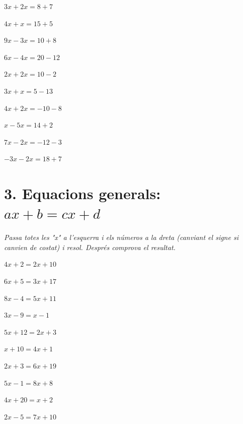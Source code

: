 \documentclass[12pt,a4paper]{article}
\begin{document}
\begin{enumerate}[label=\alph*), itemsep=1ex]
    \begin{minipage}[t]{0.45\textwidth}
        \item $3x + 2x = 8 + 7$
        \item $4x + x = 15 + 5$
        \item $9x - 3x = 10 + 8$
        \item $6x - 4x = 20 - 12$
        \item $2x + 2x = 10 - 2$
    \end{minipage}
    \begin{minipage}[t]{0.45\textwidth}
        \item $3x + x = 5 - 13$
        \item $4x + 2x = -10 - 8$
        \item $x - 5x = 14 + 2$
        \item $7x - 2x = -12 - 3$
        \item $-3x - 2x = 18 + 7$
    \end{minipage}
\end{enumerate}

\vspace{0.8cm}
\newpage
\section*{3. Equacions generals: $ax + b = cx + d$}
\textit{Passa totes les "x" a l'esquerra i els números a la dreta (canviant el signe si canvien de costat) i resol. Després comprova el resultat.}

\begin{enumerate}[label=\alph*), itemsep=1ex]
    \begin{minipage}[t]{0.45\textwidth}
        \item $4x + 2 = 2x + 10$
        \item $6x + 5 = 3x + 17$
        \item $8x - 4 = 5x + 11$
        \item $3x - 9 = x - 1$
        \item $5x + 12 = 2x + 3$
    \end{minipage}
    \begin{minipage}[t]{0.45\textwidth}
        \item $x + 10 = 4x + 1$
        \item $2x + 3 = 6x + 19$
        \item $5x - 1 = 8x + 8$
        \item $4x + 20 = x + 2$
        \item $2x - 5 = 7x + 10$
    \end{minipage}
\end{enumerate}
\end{document}
